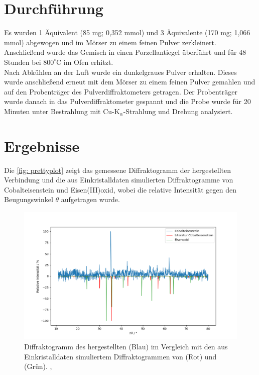 \documentclass[a4paper,12pt,bibliography=totocnumbered]{scrartcl}
\begin{document}
\section{Durchführung}
Es wurden 1 Äquivalent (85 mg; 0,352 mmol) und 3 Äquivalente (170 mg; 1,066 mmol) abgewogen und im Mörser zu einem feinen Pulver zerkleinert. 
Anschließend wurde das Gemisch in einen Porzellantiegel überführt und für 48 Stunden bei $800 ^\circ$C im Ofen erhitzt.\\
Nach Abkühlen an der Luft wurde ein dunkelgraues Pulver erhalten. 
Dieses wurde anschließend erneut mit dem Mörser zu einem feinen Pulver gemahlen und auf den Probenträger des Pulverdiffraktometers getragen. 
Der Probenträger wurde danach in das Pulverdiffraktometer gespannt und die Probe wurde für 20 Minuten unter Bestrahlung mit Cu-K$_\alpha$-Strahlung und Drehung analysiert.

\newpage

\section{Ergebnisse}
Die \autoref{fig: prettyplot} zeigt das gemessene Diffraktogramm der hergestellten Verbindung und 
die aus Einkristalldaten simulierten Diffraktogramme von Cobalteisenstein und Eisen(III)oxid, 
wobei die relative Intensität gegen den Beugungswinkel $\theta$ aufgetragen wurde. 
\begin{figure}[H]
    \centering
    \includegraphics[scale=0.65]{Bilder/messreihen.png}
    \caption{Diffraktogramm des hergestellten  (Blau) im Vergleich mit den aus Einkristalldaten simuliertem Diffraktogrammen von  (Rot) und  (Grün). \cite{Rieck}, \cite{FeDiff}}
    \label{fig: prettyplot}
\end{figure}
\end{document}
